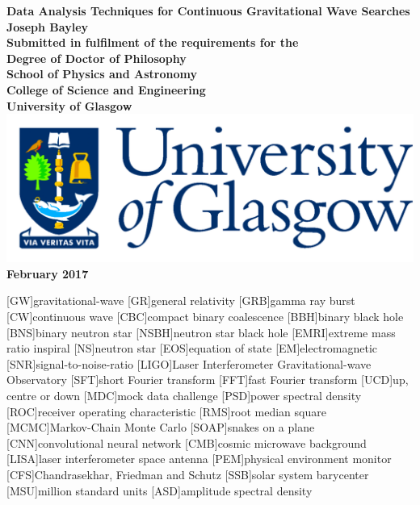 \documentclass[12pt,titlepage,oneside]{book}
\begin{document}
\begin{titlepage}
\centering
\vspace*{3cm}  %
\bfseries\Large
Data Analysis Techniques for Continuous Gravitational Wave Searches\\
\vspace{3cm}
\normalfont\large
Joseph Bayley\\
\vspace{2cm}
Submitted in fulfilment of the requirements for the\\
Degree of Doctor of Philosophy\\
\vspace{2cm}
School of Physics and Astronomy\\
College of Science and Engineering\\
University of Glasgow\\
\vspace{1cm}
\includegraphics[scale=0.125]{GlaLogo.pdf}
\\
\vspace{1cm}
February 2017
\end{titlepage}
\frontmatter  %

\tableofcontents
\listoftables
\listoffigures



[GW]{gravitational-wave}
[GR]{general relativity}
[GRB]{gamma ray burst}
[CW]{continuous wave}
[CBC]{compact binary coalescence}
[BBH]{binary black hole}
[BNS]{binary neutron star}
[NSBH]{neutron star black hole}
[EMRI]{extreme mass ratio inspiral}
[NS]{neutron star}
[EOS]{equation of state}
[EM]{electromagnetic}
[SNR]{signal-to-noise-ratio}
[LIGO]{Laser Interferometer Gravitational-wave Observatory}
[SFT]{short Fourier transform}
[FFT]{fast Fourier transform}
[UCD]{up, centre or down}
[MDC]{mock data challenge}
[PSD]{power spectral density}
[ROC]{receiver operating characteristic}
[RMS]{root median square}
[MCMC]{Markov-Chain Monte Carlo}
[SOAP]{snakes on a plane}
[CNN]{convolutional neural network}
[CMB]{cosmic microwave background}
[LISA]{laser interferometer space antenna}
[PEM]{physical environment monitor}
[CFS]{Chandrasekhar, Friedman and Schutz}
[SSB]{solar system barycenter}
[MSU]{million standard units}
[ASD]{amplitude spectral density}
\end{document}
